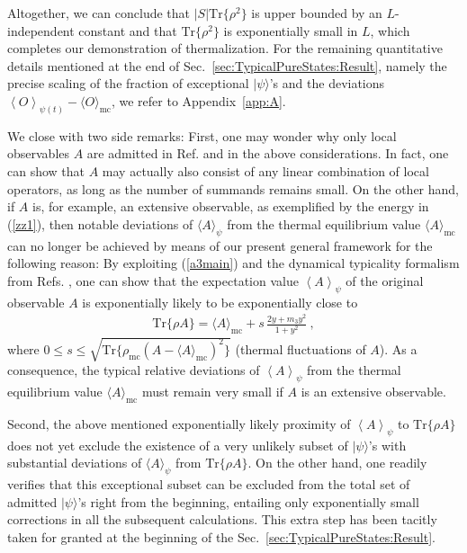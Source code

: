 \documentclass[twocolumn,aps,prb,floatfix,superscriptaddress]{revtex4-2}
\newcommand{\ket}[1]{\lvert #1 \rangle} 	%
\newcommand{\<}{\left\langle}	%
\renewcommand{\>}{\right\rangle}	%
\newcommand{\tr}{\mbox{Tr}}
\newcommand{\Amc}{\langle A\rangle_{\!\mathrm{mc}}}
\newcommand{\Omc}{\langle O\rangle_{\!\mathrm{mc}}}
\newcommand{\rhomic}{\rho_{\mathrm{mc}}}
\begin{document}
Altogether, we can conclude that
$|S|\tr\{\rho^2\}$ is upper bounded by an
$L$-independent constant and that
$\tr\{\rho^2\}$ is exponentially small in $L$,
which completes our demonstration of thermalization.
For the remaining quantitative details
mentioned at the end of Sec.~\ref{sec:TypicalPureStates:Result},
namely the precise
scaling 
of the fraction of exceptional $\ket\psi$'s and  the 
deviations $\< O \>_{\!\psi(t)} - \Omc$,
we refer to Appendix~\ref{app:A}.

We close with two side remarks:
First, one may wonder why only local observables
$A$ are admitted in Ref. \cite{bar09} and in the
above considerations. In fact, one can show that
$A$ may actually also consist of any linear combination 
of local operators, as long as the number of summands
remains small.
On the other hand, if $A$ is, for example, an extensive 
observable,
as exemplified by the energy in 
(\ref{zz1}), then 
notable deviations of 
$\langle A\rangle_{\!\psi}$ from the thermal 
equilibrium value $\Amc$ 
can no longer be achieved
by means of our present general framework
for the following reason:
By exploiting (\ref{a3main}) and the dynamical typicality
formalism from Refs. \cite{rei20}, one can show that
the expectation value $\< A \>_{\!\psi}$
of the original observable $A$
is exponentially likely to be exponentially close to
\begin{eqnarray}
\tr\{\rho A \} = \Amc + s \,  \frac{2y+m_3 y^2}{1+y^2}
\ ,
\label{a22x}
\end{eqnarray}
where $0\leq s\leq\sqrt{\tr\{ \rhomic (A - \Amc)^2 \}}$
(thermal fluctuations of $A$).
As a consequence, the typical relative deviations of  $\< A \>_{\!\psi}$ 
from the thermal equilibrium value $\Amc$ 
must remain very small if $A$ is an extensive observable.

Second,
the above mentioned exponentially likely proximity of $\< A \>_{\!\psi}$ to $\tr\{\rho A\}$ 
does not yet exclude the existence of a very
unlikely subset of $|\psi\rangle$'s with substantial 
deviations of $\langle A\rangle_{\!\psi}$ 
from $\tr\{\rho A\}$.
On the other hand, one readily verifies that this exceptional
subset can be excluded from the total
set of admitted $|\psi\rangle$'s right from the beginning,
entailing only exponentially small corrections in all the 
subsequent calculations.
This extra step has been tacitly taken for granted
at the beginning of the
Sec.~\ref{sec:TypicalPureStates:Result}.



\end{document}
